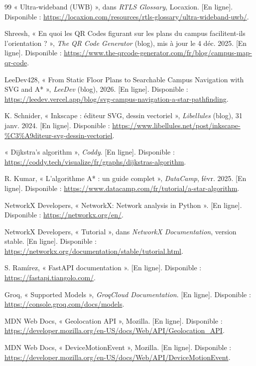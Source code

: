 \documentclass[12pt,a4paper]{report}
\begin{document}
\begin{thebibliography}{99}
 « Ultra-wideband (UWB) », dans \emph{RTLS Glossary}, Locaxion. [En ligne]. Disponible :
\url{https://locaxion.com/resources/rtls-glossary/ultra-wideband-uwb/}.

 Shreesh, « En quoi les QR Codes figurant sur les plans du campus facilitent-ils
l'orientation ? », \emph{The QR Code Generator} (blog), mis à jour le 4 déc. 2025. [En ligne].
Disponible : \url{https://www.the-qrcode-generator.com/fr/blog/campus-map-qr-code}.

 LeeDev428, « From Static Floor Plans to Searchable Campus Navigation with SVG and
A* », \emph{LeeDev} (blog), 2026. [En ligne]. Disponible :
\url{https://leedev.vercel.app/blog/svg-campus-navigation-a-star-pathfinding}.

 K. Schnider, « Inkscape : éditeur SVG, dessin vectoriel », \emph{Libellules}
(blog), 31 janv. 2024. [En ligne]. Disponible :
\url{https://www.libellules.net/post/inkscape-\%C3\%A9diteur-svg-dessin-vectoriel}.

 « Dijkstra's algorithm », \emph{Coddy}. [En ligne]. Disponible :
\url{https://coddy.tech/visualize/fr/graphs/dijkstras-algorithm}.

 R. Kumar, « L'algorithme A* : un guide complet », \emph{DataCamp}, févr. 2025.
[En ligne]. Disponible : \url{https://www.datacamp.com/fr/tutorial/a-star-algorithm}.

 NetworkX Developers, « NetworkX: Network analysis in Python ». [En ligne].
Disponible : \url{https://networkx.org/en/}.

 NetworkX Developers, « Tutorial », dans \emph{NetworkX Documentation}, version stable.
[En ligne]. Disponible : \url{https://networkx.org/documentation/stable/tutorial.html}.

 S. Ramírez, « FastAPI documentation ». [En ligne]. Disponible :
\url{https://fastapi.tiangolo.com/}.

 Groq, « Supported Models », \emph{GroqCloud Documentation}. [En ligne]. Disponible :
\url{https://console.groq.com/docs/models}.

 MDN Web Docs, « Geolocation API », Mozilla. [En ligne]. Disponible :
\url{https://developer.mozilla.org/en-US/docs/Web/API/Geolocation_API}.

 MDN Web Docs, « DeviceMotionEvent », Mozilla. [En ligne]. Disponible :
\url{https://developer.mozilla.org/en-US/docs/Web/API/DeviceMotionEvent}.


\end{thebibliography}
\end{document}
